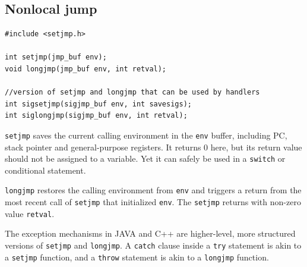 \subsection{Nonlocal jump}
\begin{lstlisting}[frame=single]
#include <setjmp.h>

int setjmp(jmp_buf env);
void longjmp(jmp_buf env, int retval);

//version of setjmp and longjmp that can be used by handlers
int sigsetjmp(sigjmp_buf env, int savesigs);
int siglongjmp(sigjmp_buf env, int retval);
\end{lstlisting}
\texttt{setjmp} saves the current calling environment in the \texttt{env} buffer, including PC, stack pointer and general-purpose registers. It returns 0 here, but its return value should not be assigned to a variable. Yet it can safely be used in a \texttt{switch} or conditional statement.

\texttt{longjmp} restores the calling environment from \texttt{env} and triggers a return from the most recent call of \texttt{setjmp} that initialized \texttt{env}. The \texttt{setjmp} returns with non-zero value \texttt{retval}.

The exception mechanisms in JAVA and C++ are higher-level, more structured versions of \texttt{setjmp} and \texttt{longjmp}. A \texttt{catch} clause inside a \texttt{try} statement is akin to a \texttt{setjmp} function, and a \texttt{throw} statement is akin to a \texttt{longjmp} function.
\ifx\PREAMBLE\undefined

\fi